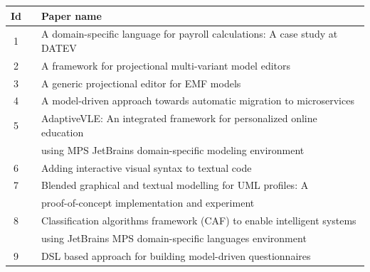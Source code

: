 \begin{table}
    \begin{center}
        \begin{tabular}{ |c  c|l | } 
            \hline
            Id  &                                        & Paper name                                                                  \\
            \hline
            1   &  \cite{voelterdomain_SLR}              & A domain-specific language for payroll calculations: A case study at DATEV  \\ \hline
            2   &  \cite{schropfer2021framework_SLR}     & A framework for projectional multi-variant model editors                    \\ \hline
            3   &  \cite{schropfer2020generic_SLR}       & A generic projectional editor for EMF models                                \\ \hline
            4   &  \cite{bucchiarone2019model_SLR}       & A model-driven approach towards automatic migration to microservices        \\ \hline
            5   &  \cite{meacham2020adaptivevle_SLR}     & AdaptiveVLE: An integrated framework for personalized online education      \\
                &                                        & using MPS JetBrains domain-specific modeling environment                    \\ \hline
            6   &  \cite{andersen2020adding_SLR}         & Adding interactive visual syntax to textual code                            \\ \hline
            7   &  \cite{addazi2021blended_SLR}          & Blended graphical and textual modelling for UML profiles: A                 \\
                &                                        & proof-of-concept implementation and experiment                              \\ \hline
            8   & \cite{meacham2020classification_SLR}   & Classification algorithms framework (CAF) to enable intelligent systems     \\
                &                                        & using JetBrains MPS domain-specific languages environment                   \\ \hline
            9   & \cite{furtado2021dsl_SLR}              & DSL based approach for building model-driven questionnaires                 \\ \hline

\end{tabular}
\end{center}
\end{table}
